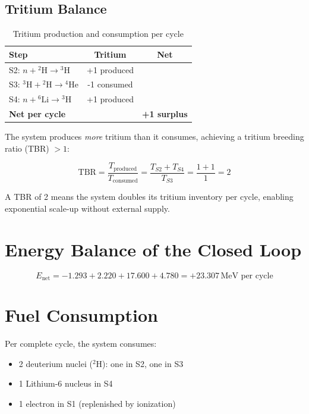 \documentclass[12pt,a4paper]{article}
\begin{document}
\subsection{Tritium Balance}

\begin{table}[h!]
\centering
\caption{Tritium production and consumption per cycle}
\vspace{0.5em}
\begin{tabular}{lcc}
\toprule
\textbf{Step} & \textbf{Tritium} & \textbf{Net} \\
\midrule
S2: $n + {}^2\text{H} \rightarrow {}^3\text{H}$ & +1 produced & \\
S3: ${}^3\text{H} + {}^2\text{H} \rightarrow {}^4\text{He}$ & -1 consumed & \\
S4: $n + {}^6\text{Li} \rightarrow {}^3\text{H}$ & +1 produced & \\
\midrule
\textbf{Net per cycle} & & \textbf{+1 surplus} \\
\bottomrule
\end{tabular}
\end{table}

The system produces \emph{more} tritium than it consumes,
achieving a tritium breeding ratio (TBR) $> 1$:

\begin{equation}
\text{TBR} = \frac{T_\text{produced}}{T_\text{consumed}}
= \frac{T_{S2} + T_{S4}}{T_{S3}} = \frac{1 + 1}{1} = 2
\end{equation}

A TBR of 2 means the system doubles its tritium inventory
per cycle, enabling exponential scale-up without external supply.

\section{Energy Balance of the Closed Loop}

\begin{equation}
E_\text{net} = -1.293 + 2.220 + 17.600 + 4.780
= \boxed{+23.307\,\text{MeV per cycle}}
\end{equation}

\section{Fuel Consumption}

Per complete cycle, the system consumes:
\begin{itemize}
\item 2 deuterium nuclei ($^2$H): one in S2, one in S3
\item 1 Lithium-6 nucleus in S4
\item 1 electron in S1 (replenished by ionization)
\end{itemize}
\end{document}

